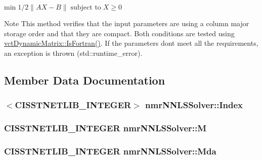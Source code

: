 $ \mbox{min} \; 1 / 2 \| AX - B \| \; \mbox{subject to} \; X \geq 0$

\begin{DoxyNote}{Note}
This method verifies that the input parameters are using a column major storage order and that they are compact. Both conditions are tested using \hyperlink{classvct_dynamic_const_matrix_base_aac5f19015b4888f760f99daa4bac199c}{vct\+Dynamic\+Matrix\+::\+Is\+Fortran()}. If the parameters don\textquotesingle{}t meet all the requirements, an exception is thrown (std\+::runtime\+\_\+error). 
\end{DoxyNote}


\subsection{Member Data Documentation}
\hypertarget{classnmr_n_n_l_s_solver_a8a75f7f12aceebd264f973684ce1b683}{}
\subsubsection[{Index}]{$<$C\+I\+S\+S\+T\+N\+E\+T\+L\+I\+B\+\_\+\+I\+N\+T\+E\+G\+E\+R$>$ nmr\+N\+N\+L\+S\+Solver\+::\+Index\hspace{0.3cm}{\ttfamily [protected]}}\label{classnmr_n_n_l_s_solver_a8a75f7f12aceebd264f973684ce1b683}
\hypertarget{classnmr_n_n_l_s_solver_a162e5dd1f43365b957bb2ba090cb0195}{}
\subsubsection[{M}]{\setlength{\rightskip}{0pt plus 5cm}C\+I\+S\+S\+T\+N\+E\+T\+L\+I\+B\+\_\+\+I\+N\+T\+E\+G\+E\+R nmr\+N\+N\+L\+S\+Solver\+::\+M\hspace{0.3cm}{\ttfamily [protected]}}\label{classnmr_n_n_l_s_solver_a162e5dd1f43365b957bb2ba090cb0195}
\hypertarget{classnmr_n_n_l_s_solver_a11885a66db967a587d588df43f31747a}{}
\subsubsection[{Mda}]{\setlength{\rightskip}{0pt plus 5cm}C\+I\+S\+S\+T\+N\+E\+T\+L\+I\+B\+\_\+\+I\+N\+T\+E\+G\+E\+R nmr\+N\+N\+L\+S\+Solver\+::\+Mda\hspace{0.3cm}{\ttfamily [protected]}}\label{classnmr_n_n_l_s_solver_a11885a66db967a587d588df43f31747a}
\hypertarget{classnmr_n_n_l_s_solver_a7f2d0fc2f14c7a924a05df0c4b58afb3}{}
